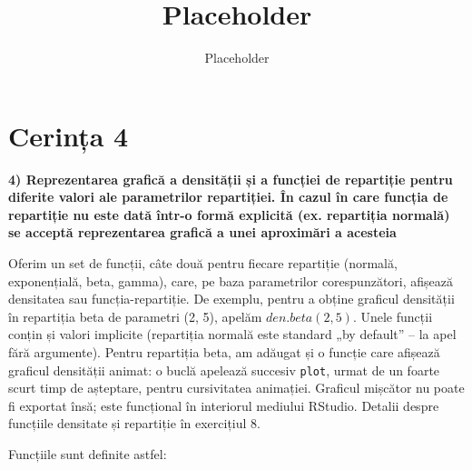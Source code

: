 \documentclass[12pt]{article}
\title{Placeholder}
\author{Placeholder}
\begin{document}
	\section{Cerința 4}
	\textbf{4) Reprezentarea grafică a densității și a funcției de repartiție pentru diferite valori ale
		parametrilor repartiției. În cazul în care funcția de repartiție nu este dată într-o formă
		explicită (ex. repartiția normală) se acceptă reprezentarea grafică a unei aproximări a acesteia}\vspace{5mm}
	
	Oferim un set de funcții, câte două pentru fiecare repartiție (normală, exponențială, beta, gamma), care, pe baza parametrilor corespunzători, afișează densitatea sau funcția-repartiție. De exemplu, pentru a obține graficul densității în repartiția beta de parametri (2, 5), apelăm $den.beta(2, 5)$. Unele funcții conțin și valori implicite (repartiția normală este standard „by default” – la apel fără argumente).
	Pentru repartiția beta, am adăugat și o funcție care afișează graficul densității animat: o buclă apelează succesiv \lstinline|plot|, urmat de un foarte scurt timp de așteptare, pentru cursivitatea animației. Graficul mișcător nu poate fi exportat însă; este funcțional în interiorul mediului RStudio. Detalii despre funcțiile densitate și repartiție în exercițiul 8. \\ \par
	Funcțiile sunt definite astfel: \\
	
\end{document}
